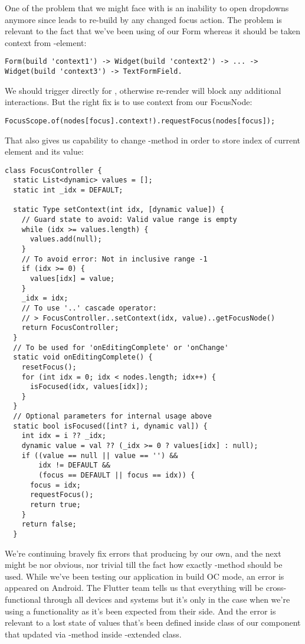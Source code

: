 \noindent One of the problem that we might face with is an inability to open dropdowns anymore since 
 leads to re-build by any changed focus action. The problem is relevant to the
fact that we've been using  of our Form whereas it should be taken context from -element:

\begin{lstlisting}
Form(build 'context1') -> Widget(build 'context2') -> ... -> Widget(build 'context3') -> TextFormField.
\end{lstlisting}

\noindent We should trigger  directly for , otherwise re-render will 
block any additional interactions. But the right fix is to use context from our FocusNode:

\begin{lstlisting}
FocusScope.of(nodes[focus].context!).requestFocus(nodes[focus]);
\end{lstlisting}

\noindent That also gives us capability to change -method in order to store index of current element 
and its value:

\begin{lstlisting}
class FocusController {
  static List<dynamic> values = [];
  static int _idx = DEFAULT;

  static Type setContext(int idx, [dynamic value]) {
    // Guard state to avoid: Valid value range is empty
    while (idx >= values.length) {
      values.add(null);
    }
    // To avoid error: Not in inclusive range -1
    if (idx >= 0) {
      values[idx] = value;
    }
    _idx = idx;
    // To use '..' cascade operator:
    // > FocusController..setContext(idx, value)..getFocusNode()
    return FocusController; 
  }
  // To be used for 'onEditingComplete' or 'onChange'
  static void onEditingComplete() {
    resetFocus();
    for (int idx = 0; idx < nodes.length; idx++) {
      isFocused(idx, values[idx]);
    }
  }
  // Optional parameters for internal usage above
  static bool isFocused([int? i, dynamic val]) {
    int idx = i ?? _idx;
    dynamic value = val ?? (_idx >= 0 ? values[idx] : null);
    if ((value == null || value == '') &&
        idx != DEFAULT &&
        (focus == DEFAULT || focus == idx)) {
      focus = idx;
      requestFocus();
      return true;
    }
    return false;
  }
\end{lstlisting}

\noindent We're continuing bravely fix errors that producing by our own, and the next might be nor obvious, nor trivial 
till the fact how exactly -method should be used. While we've been testing our application in build OC mode, 
an error is appeared on Android. The Flutter team tells us that everything will be cross-functional through all devices
and systems but it's only in the case when we're using a functionality as it's been expected from their side. And 
the error is relevant to a lost state of values that's been defined inside  class of our 
component that updated via -method inside -extended class.

